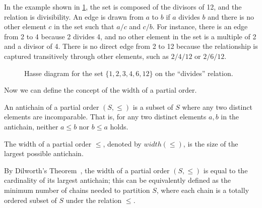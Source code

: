 \begin{example} \label{ex:hasse}
    In the example shown in \cref{fig:hasse_diagram_example}, the set is composed of the divisors of 12, and the relation is divisibility. An edge is drawn from $a$ to $b$ if $a$ divides $b$ and there is no other element $c$ in the set such that $a/c$ and $c/b$. For instance, there is an edge from 2 to 4 because 2 divides 4, and no other element in the set is a multiple of 2 and a divisor of 4. There is no direct edge from 2 to 12 because the relationship is captured transitively through other elements, such as $2/4/12$ or $2/6/12$.
    \begin{figure}[H]
        \centering
        \caption{Hasse diagram for the set $\{1, 2, 3, 4, 6, 12\}$ on the ``divides'' relation.}
        \label{fig:hasse_diagram_example}
    \end{figure}
\end{example}

Now we can define the concept of the width of a partial order.

\begin{definition}[Antichain]
    An antichain of a partial order $(S, \leq)$ is a subset of $S$ where any two distinct elements are incomparable. That is, for any two distinct elements $a, b$ in the antichain, neither $a \leq b$ nor $b \leq a$ holds.
\end{definition}

\begin{definition}
    The width of a partial order $\leq$, denoted by $width(\leq)$, is the size of the largest possible antichain.
\end{definition}

By Dilworth's Theorem~\cite{dilworth1990decomposition}, the width of a partial order $(S, \leq)$ is equal to the cardinality of its largest antichain; this can be equivalently defined as the minimum number of chains needed to partition $S$, where each chain is a totally ordered subset of $S$ under the relation $\leq$. 

